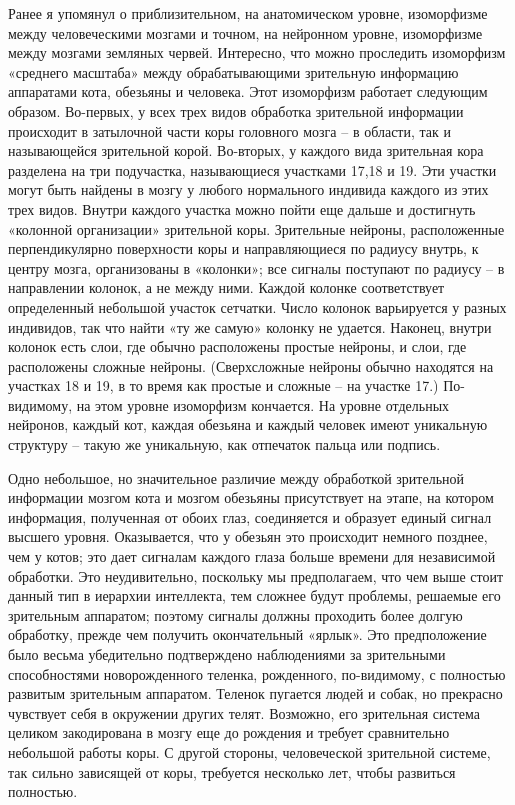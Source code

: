 \documentclass[../main.tex]{subfiles}
\begin{document}
Ранее я упомянул о приблизительном, на анатомическом уровне, изоморфизме между человеческими мозгами и точном, на нейронном уровне, изоморфизме между мозгами земляных червей. Интересно, что можно проследить изоморфизм «среднего масштаба» между обрабатывающими зрительную информацию аппаратами кота, обезьяны и человека. Этот изоморфизм работает следующим образом. Во-первых, у всех трех видов обработка зрительной информации происходит в затылочной части коры головного мозга \--- в области, так и называющейся зрительной корой. Во-вторых, у каждого вида зрительная кора разделена на три подучастка, называющиеся участками 17,18 и 19. Эти участки могут быть найдены в мозгу у любого нормального индивида каждого из этих трех видов. Внутри каждого участка можно пойти еще дальше и достигнуть «колонной организации» зрительной коры. Зрительные нейроны, расположенные перпендикулярно поверхности коры и направляющиеся по радиусу внутрь, к центру мозга, организованы в «колонки»; все сигналы поступают по радиусу \--- в направлении колонок, а не между ними. Каждой колонке соответствует определенный небольшой участок сетчатки. Число колонок варьируется у разных индивидов, так что найти «ту же самую» колонку не удается. Наконец, внутри колонок есть слои, где обычно расположены простые нейроны, и слои, где расположены сложные нейроны. (Сверхсложные нейроны обычно находятся на участках 18 и 19, в то время как простые и сложные \--- на участке 17.) По-видимому, на этом уровне изоморфизм кончается. На уровне отдельных нейронов, каждый кот, каждая обезьяна и каждый человек имеют уникальную структуру \--- такую же уникальную, как отпечаток пальца или подпись.

Одно небольшое, но значительное различие между обработкой зрительной информации мозгом кота и мозгом обезьяны присутствует на этапе, на котором информация, полученная от обоих глаз, соединяется и образует единый сигнал высшего уровня. Оказывается, что у обезьян это происходит немного позднее, чем у котов; это дает сигналам каждого глаза больше времени для независимой обработки. Это неудивительно, поскольку мы предполагаем, что чем выше стоит данный тип в иерархии интеллекта, тем сложнее будут проблемы, решаемые его зрительным аппаратом; поэтому сигналы должны проходить более долгую обработку, прежде чем получить окончательный «ярлык». Это предположение было весьма убедительно подтверждено наблюдениями за зрительными способностями новорожденного теленка, рожденного, по-видимому, с полностью развитым зрительным аппаратом. Теленок пугается людей и собак, но прекрасно чувствует себя в окружении других телят. Возможно, его зрительная система целиком закодирована в мозгу еще до рождения и требует сравнительно небольшой работы коры. С другой стороны, человеческой зрительной системе, так сильно зависящей от коры, требуется несколько лет, чтобы развиться полностью.
\end{document}
